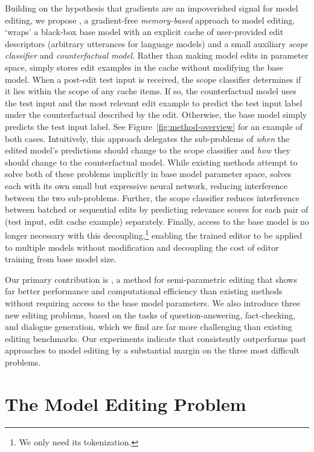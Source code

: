 \documentclass{article}
\begin{document}


Building on the hypothesis that gradients are an impoverished signal for model editing, we propose {\name}, a gradient-free \textit{memory-based} approach to model editing. {\name} `wraps' a black-box base model with an explicit cache of user-provided edit descriptors (arbitrary utterances for language models) and a small auxiliary \textit{scope classifier} and \textit{counterfactual model}. Rather than making model edits in parameter space, {\name} simply stores edit examples in the cache without modifying the base model. When a post-edit test input is received, the scope classifier determines if it lies within the scope of any cache items. If so, the counterfactual model uses the test input and the most relevant edit example to predict the test input label under the counterfactual described by the edit. Otherwise, the base model simply predicts the test input label. See Figure~\ref{fig:method-overview} for an example of both cases. Intuitively, this approach delegates the sub-problems of \textit{when} the edited model's predictions should change to the scope classifier and \textit{how} they should change to the counterfactual model. While existing methods attempt to solve both of these problems implicitly in base model parameter space, {\name} solves each with its own small but expressive neural network, reducing interference between the two sub-problems. Further, the scope classifier reduces interference between batched or sequential edits by predicting relevance scores for each pair of (test input, edit cache example) separately. Finally, access to the base model is no longer necessary with this decoupling,\footnote{We only need its tokenization.} enabling the trained editor to be applied to multiple models without modification and decoupling the cost of editor training from base model size.

Our primary contribution is {\name}, a method for semi-parametric editing that shows far better performance and computational efficiency than existing methods without requiring access to the base model parameters. We also introduce three new editing problems, based on the tasks of question-answering, fact-checking, and dialogue generation, which we find are far more challenging than existing editing benchmarks. Our experiments indicate that {\name} consistently outperforms past approaches to model editing by a substantial margin on the three most difficult problems.

\section{The Model Editing Problem}
\end{document}
